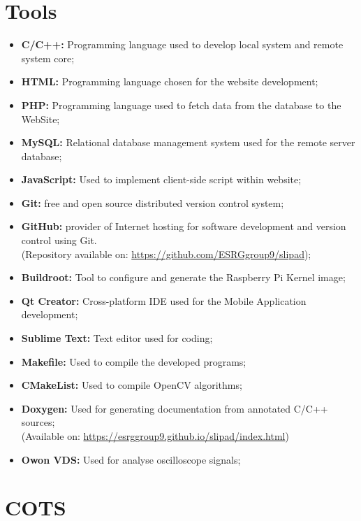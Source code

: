 \clearpage
\section{Tools}

\begin{itemize}
	\item \textbf{C/C++:} Programming language used to develop local system and remote system core;
	\item \textbf{HTML:} Programming language chosen for the website development;
	\item \textbf{PHP:} Programming language used to fetch data from the database to the WebSite;
	\item \textbf{MySQL:} Relational database management system used for the remote server database;
	\item \textbf{JavaScript:} Used to implement client-side script within website;
	\item \textbf{Git:} free and open source distributed version control system;
	\item \textbf{GitHub:} provider of Internet hosting for software development and version control using Git. \\ (Repository available on: \url{https://github.com/ESRGgroup9/slipad});
	\item \textbf{Buildroot:} Tool to configure and generate the Raspberry Pi Kernel image;
	
	\item \textbf{Qt Creator:} Cross-platform IDE used for the Mobile Application development;
	\item \textbf{Sublime Text:} Text editor used for coding;
			
	\item \textbf{Makefile:} Used to compile the developed programs;
	\item \textbf{CMakeList:} Used to compile OpenCV algorithms;

	\item \textbf{Doxygen:} Used for generating documentation from annotated C/C++ sources; \\ (Available on: \url{https://esrggroup9.github.io/slipad/index.html})
	\item \textbf{Owon VDS:} Used for analyse oscilloscope signals;
\end{itemize}

\section{COTS}

